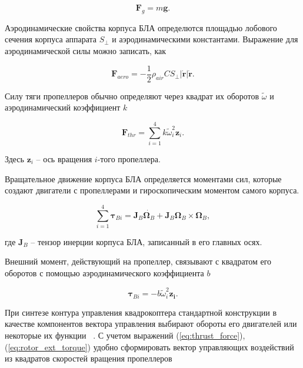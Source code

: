 \begin{equation} \label{eq:gravity_force}
\bm{F}_g = m\bm{g}.
\end{equation}

Аэродинамические свойства корпуса БЛА определются площадью лобового сечения корпуса аппарата {$S_{\perp}$} и аэродинамическими константами. Выражение для аэродинамической силы можно записать, как ~\cite{Biard01}

\begin{equation} \label{eq:aerodynamic_force}
\bm{F}_{aero} = - \frac{1}{2} \rho_{air} C S_{\perp} |\dot{\bm{r}}| \dot{\bm{r}}.
\end{equation}

Силу тяги пропеллеров обычно определяют через квадрат их оборотов $\tilde\omega$ и аэродинамический коэффициент $k$ ~\cite{Falconi01}

\begin{equation} \label{eq:thrust_force}
\bm{F}_{thr} = \sum_{i=1}^{4}{ { k \tilde\omega^2_i \bm{z}_i}.}
\end{equation}

Здесь $\bm{z}_i$ -- ось вращения $i$-того пропеллера.
 
Вращательное движение корпуса БЛА определяется моментами сил, которые создают двигатели с пропеллерами и гироскопическим моментом самого корпуса.

  	\begin{equation} \label{eq:common_rotational_motion}
  	\sum_{i=1}^{4}{\bm{\tau}_{Bi}} = \bm{J}_B\dot{\bm{\Omega}_B} + \bm{J}_B{\bm{\Omega}_B} \times \bm{\Omega}_B,
  	\end{equation}

где $\bm{J}_B$ -- тензор инерции корпуса БЛА, записанный в его главных осях.

 Внешний момент, действующий на пропеллер, связывают с квадратом его оборотов с помощью аэродинамического коэффициента $b$ ~\cite{Ryll01}
	
	\begin{equation} \label{eq:rotor_ext_torque}
\bm{\tau}_{Bi} = -b \tilde{\omega}^2_i \bm{z_i}.
	\end{equation}
  	
 При синтезе контура управления квадрокоптера стандартной конструкции в качестве компонентов вектора управления выбирают обороты его двигателей или некоторые их функции ~\cite{Lee02, Sharifi01, Luukkonen01, Bemporad01}.  С учетом выражений (\ref{eq:thrust_force}), (\ref{eq:rotor_ext_torque}) удобно сформировать вектор управляющих воздействий из квадратов скоростей вращения пропеллеров

